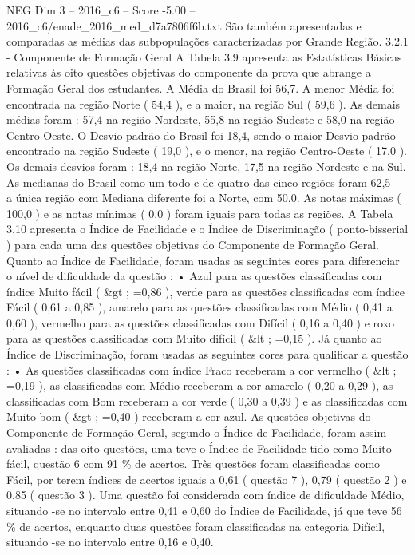 \begin{textsample}{NEG Dim 3 – 2016\_c6 – Score -5.00 – 2016\_c6/enade\_2016\_med\_d7a7806f6b.txt}
São também apresentadas e comparadas as médias das subpopulações caracterizadas por Grande Região. 3.2.1 - Componente de Formação Geral A Tabela 3.9 apresenta as Estatísticas Básicas relativas às oito questões objetivas do componente da prova que abrange a Formação Geral dos estudantes.
A Média do Brasil foi 56,7.
A menor Média foi encontrada na região Norte ( 54,4 ), e a maior, na região Sul ( 59,6 ).
As demais médias foram : 57,4 na região Nordeste, 55,8 na região Sudeste e 58,0 na região Centro-Oeste.
O Desvio padrão do Brasil foi 18,4, sendo o maior Desvio padrão encontrado na região Sudeste ( 19,0 ), e o menor, na região Centro-Oeste ( 17,0 ).
Os demais desvios foram : 18,4 na região Norte, 17,5 na região Nordeste e na Sul.
As medianas do Brasil como um todo e de quatro das cinco regiões foram 62,5 — a única região com Mediana diferente foi a Norte, com 50,0.
As notas máximas ( 100,0 ) e as notas mínimas ( 0,0 ) foram iguais para todas as regiões.
A Tabela 3.10 apresenta o Índice de Facilidade e o Índice de Discriminação ( ponto-bisserial ) para cada uma das questões objetivas do Componente de Formação Geral.
Quanto ao Índice de Facilidade, foram usadas as seguintes cores para diferenciar o nível de dificuldade da questão : • Azul para as questões classificadas com índice Muito fácil ( \&gt ; =0,86 ), verde para as questões classificadas com índice Fácil ( 0,61 a 0,85 ), amarelo para as questões classificadas com Médio ( 0,41 a 0,60 ), vermelho para as questões classificadas com Difícil ( 0,16 a 0,40 ) e roxo para as questões classificadas com Muito difícil ( \&lt ; =0,15 ).
Já quanto ao Índice de Discriminação, foram usadas as seguintes cores para qualificar a questão : • As questões classificadas com índice Fraco receberam a cor vermelho ( \&lt ; =0,19 ), as classificadas com Médio receberam a cor amarelo ( 0,20 a 0,29 ), as classificadas com Bom receberam a cor verde ( 0,30 a 0,39 ) e as classificadas com Muito bom ( \&gt ; =0,40 ) receberam a cor azul.
As questões objetivas do Componente de Formação Geral, segundo o Índice de Facilidade, foram assim avaliadas : das oito questões, uma teve o Índice de Facilidade tido como Muito fácil, questão 6 com 91 \% de acertos.
Três questões foram classificadas como Fácil, por terem índices de acertos iguais a 0,61 ( questão 7 ), 0,79 ( questão 2 ) e 0,85 ( questão 3 ).
Uma questão foi considerada com índice de dificuldade Médio, situando -se no intervalo entre 0,41 e 0,60 do Índice de Facilidade, já que teve 56 \% de acertos, enquanto duas questões foram classificadas na categoria Difícil, situando -se no intervalo entre 0,16 e 0,40.

\end{textsample}
